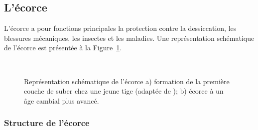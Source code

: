 \subsection{L'écorce}

L'écorce a pour fonctions principales la protection contre la dessiccation, les blessures mécaniques, les insectes et les maladies. Une représentation schématique de l'écorce est présentée à la Figure~\ref{ecorce}. 

\begin{figure}[h]
\centering


~

\caption{Représentation schématique de l'écorce  a) formation de la première couche de suber chez une jeune tige (adaptée de \cite{weier1974botany}); b) écorce à un âge cambial plus avancé.}
\label{ecorce}
\end{figure}

\subsubsection{Structure de l'écorce}

